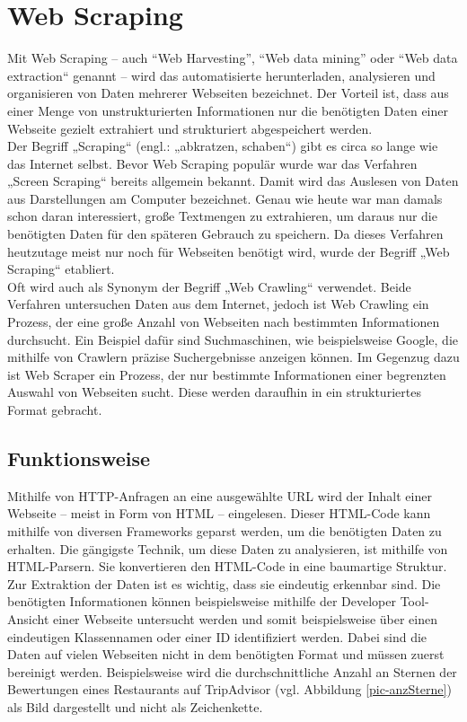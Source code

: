 \documentclass[a4paper,oneside,12pt]{report}
\begin{document}
			
		\section[Web Scraping - Johanna Sickendiek]{Web Scraping}
		
			Mit Web Scraping – auch “Web Harvesting”, “Web data mining” oder “Web data extraction“ genannt – wird das automatisierte herunterladen, analysieren und organisieren von Daten mehrerer Webseiten bezeichnet. Der Vorteil ist, dass aus einer Menge von unstrukturierten Informationen nur die benötigten Daten einer Webseite gezielt extrahiert und strukturiert abgespeichert werden. \cite{bib-webscraping}
			\\			
			Der Begriff „Scraping“ (engl.: „abkratzen, schaben“) gibt es circa so lange wie das Internet selbst. Bevor Web Scraping populär wurde war das Verfahren „Screen Scraping“ bereits allgemein bekannt. Damit wird das Auslesen von Daten aus Darstellungen am Computer bezeichnet. Genau wie heute war man damals schon daran interessiert, große Textmengen zu extrahieren, um daraus nur die benötigten Daten für den späteren Gebrauch zu speichern. Da dieses Verfahren heutzutage meist nur noch für Webseiten benötigt wird, wurde der Begriff „Web Scraping“ etabliert. \cite{bib-webscraping}
			\\
			Oft wird auch als Synonym der Begriff „Web Crawling“ verwendet. Beide Verfahren untersuchen Daten aus dem Internet, jedoch ist Web Crawling ein Prozess, der eine große Anzahl von Webseiten nach bestimmten Informationen durchsucht. Ein Beispiel dafür sind Suchmaschinen, wie beispielsweise Google, die mithilfe von Crawlern präzise Suchergebnisse anzeigen können. Im Gegenzug dazu ist Web Scraper ein Prozess, der nur bestimmte Informationen einer begrenzten Auswahl von Webseiten sucht. Diese werden daraufhin in ein strukturiertes Format gebracht. \cite{bib-articlewebscraping}
			
			
			\subsection[Funktionsweise - Johanna Sickendiek]{Funktionsweise}
			
				Mithilfe von HTTP-Anfragen an eine ausgewählte URL wird der Inhalt einer Webseite – meist in Form von HTML – eingelesen. Dieser HTML-Code kann mithilfe von diversen Frameworks geparst werden, um die benötigten Daten zu erhalten. Die gängigste Technik, um diese Daten zu analysieren, ist mithilfe von HTML-Parsern. Sie konvertieren den HTML-Code in eine baumartige Struktur.  \cite{bib-scrapehero}
				\\
				Zur Extraktion der Daten ist es wichtig, dass sie eindeutig erkennbar sind. Die benötigten Informationen können beispielsweise mithilfe der Developer Tool-Ansicht einer Webseite untersucht werden und somit beispielsweise über einen eindeutigen Klassennamen oder einer ID identifiziert werden. Dabei sind die Daten auf vielen Webseiten nicht in dem benötigten Format und müssen zuerst bereinigt werden. Beispielsweise wird die durchschnittliche Anzahl an Sternen der Bewertungen eines Restaurants auf TripAdvisor (vgl. Abbildung \ref{pic-anzSterne}) als Bild dargestellt und nicht als Zeichenkette. \cite{bib-scrapehero}
				
\end{document}
